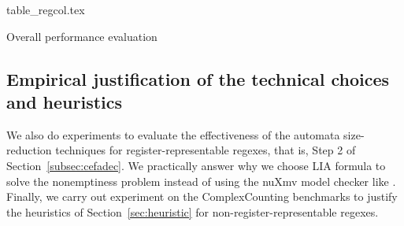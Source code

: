 \begin{table}
  \centering\vskip 0pt
    {table_regcol.tex}
    \caption{Overall performance evaluation}
  \label{fig:table_overall_eval}
\end{table}





\subsection{Empirical justification of the technical choices and heuristics}\label{subsec:size_reduction_eval}
We also do experiments to evaluate the effectiveness of the automata size-reduction techniques for register-representable regexes, that is, Step 2 of Section~\ref{subsec:cefadec}. We practically answer why we choose LIA formula to solve the nonemptiness problem instead of using the nuXmv model checker like \cite{atva2020}. Finally, we carry out experiment on the ComplexCounting benchmarks to justify the heuristics of Section~\ref{sec:heuristic} for non-register-representable regexes.
